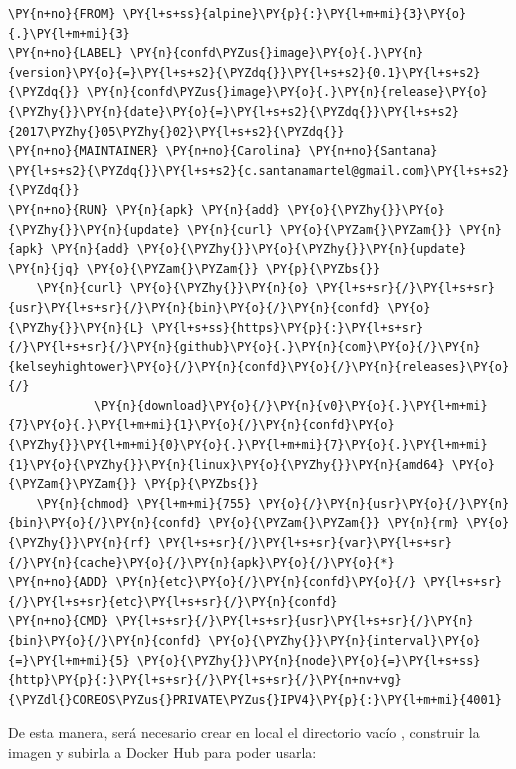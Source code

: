 \begin{codelisting}
\label{code:dockerfile-confd}
\begin{Verbatim}[fontsize=\relsize{-2.5},fontseries=b,commandchars=\\\{\}]
\PY{n+no}{FROM} \PY{l+s+ss}{alpine}\PY{p}{:}\PY{l+m+mi}{3}\PY{o}{.}\PY{l+m+mi}{3}
\PY{n+no}{LABEL} \PY{n}{confd\PYZus{}image}\PY{o}{.}\PY{n}{version}\PY{o}{=}\PY{l+s+s2}{\PYZdq{}}\PY{l+s+s2}{0.1}\PY{l+s+s2}{\PYZdq{}} \PY{n}{confd\PYZus{}image}\PY{o}{.}\PY{n}{release}\PY{o}{\PYZhy{}}\PY{n}{date}\PY{o}{=}\PY{l+s+s2}{\PYZdq{}}\PY{l+s+s2}{2017\PYZhy{}05\PYZhy{}02}\PY{l+s+s2}{\PYZdq{}}
\PY{n+no}{MAINTAINER} \PY{n+no}{Carolina} \PY{n+no}{Santana} \PY{l+s+s2}{\PYZdq{}}\PY{l+s+s2}{c.santanamartel@gmail.com}\PY{l+s+s2}{\PYZdq{}}
\PY{n+no}{RUN} \PY{n}{apk} \PY{n}{add} \PY{o}{\PYZhy{}}\PY{o}{\PYZhy{}}\PY{n}{update} \PY{n}{curl} \PY{o}{\PYZam{}\PYZam{}} \PY{n}{apk} \PY{n}{add} \PY{o}{\PYZhy{}}\PY{o}{\PYZhy{}}\PY{n}{update} \PY{n}{jq} \PY{o}{\PYZam{}\PYZam{}} \PY{p}{\PYZbs{}}
    \PY{n}{curl} \PY{o}{\PYZhy{}}\PY{n}{o} \PY{l+s+sr}{/}\PY{l+s+sr}{usr}\PY{l+s+sr}{/}\PY{n}{bin}\PY{o}{/}\PY{n}{confd} \PY{o}{\PYZhy{}}\PY{n}{L} \PY{l+s+ss}{https}\PY{p}{:}\PY{l+s+sr}{/}\PY{l+s+sr}{/}\PY{n}{github}\PY{o}{.}\PY{n}{com}\PY{o}{/}\PY{n}{kelseyhightower}\PY{o}{/}\PY{n}{confd}\PY{o}{/}\PY{n}{releases}\PY{o}{/}
            \PY{n}{download}\PY{o}{/}\PY{n}{v0}\PY{o}{.}\PY{l+m+mi}{7}\PY{o}{.}\PY{l+m+mi}{1}\PY{o}{/}\PY{n}{confd}\PY{o}{\PYZhy{}}\PY{l+m+mi}{0}\PY{o}{.}\PY{l+m+mi}{7}\PY{o}{.}\PY{l+m+mi}{1}\PY{o}{\PYZhy{}}\PY{n}{linux}\PY{o}{\PYZhy{}}\PY{n}{amd64} \PY{o}{\PYZam{}\PYZam{}} \PY{p}{\PYZbs{}}
    \PY{n}{chmod} \PY{l+m+mi}{755} \PY{o}{/}\PY{n}{usr}\PY{o}{/}\PY{n}{bin}\PY{o}{/}\PY{n}{confd} \PY{o}{\PYZam{}\PYZam{}} \PY{n}{rm} \PY{o}{\PYZhy{}}\PY{n}{rf} \PY{l+s+sr}{/}\PY{l+s+sr}{var}\PY{l+s+sr}{/}\PY{n}{cache}\PY{o}{/}\PY{n}{apk}\PY{o}{/}\PY{o}{*}
\PY{n+no}{ADD} \PY{n}{etc}\PY{o}{/}\PY{n}{confd}\PY{o}{/} \PY{l+s+sr}{/}\PY{l+s+sr}{etc}\PY{l+s+sr}{/}\PY{n}{confd}
\PY{n+no}{CMD} \PY{l+s+sr}{/}\PY{l+s+sr}{usr}\PY{l+s+sr}{/}\PY{n}{bin}\PY{o}{/}\PY{n}{confd} \PY{o}{\PYZhy{}}\PY{n}{interval}\PY{o}{=}\PY{l+m+mi}{5} \PY{o}{\PYZhy{}}\PY{n}{node}\PY{o}{=}\PY{l+s+ss}{http}\PY{p}{:}\PY{l+s+sr}{/}\PY{l+s+sr}{/}\PY{n+nv+vg}{\PYZdl{}COREOS\PYZus{}PRIVATE\PYZus{}IPV4}\PY{p}{:}\PY{l+m+mi}{4001}
\end{Verbatim}
\end{codelisting}

De esta manera, será necesario crear en local el directorio vacío , construir la imagen y subirla a Docker Hub para poder usarla:

